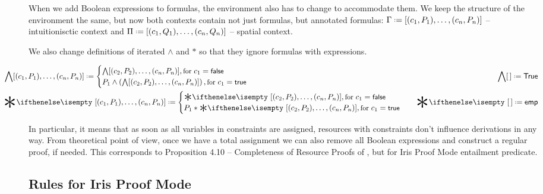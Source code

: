 When we add Boolean expressions to formulas, the environment also has to change to accommodate them.
We keep the structure of the environment the same, but now both contexts contain not just formulas, but annotated formulas:
\(\IntuD \defeq [(c_1,P_1),\dots,(c_n,P_n)]\) -- intuitionisctic context and \(\SpatD \defeq [(c_1,Q_1),\dots,(c_n,Q_n)]\) -- spatial context.

We also change definitions of iterated \(\wedge\) and \(*\) so that they ignore formulas with \false expressions.

\begin{minipage}[t]{1.1\linewidth}
  \begin{align*}
    & \hspace{-0.1\linewidth}
      \bigwedge  [(c_1, P_1), \dots, (c_n, P_n)] \defeq
      \begin{cases}
        \bigwedge [(c_2, P_2), \dots, (c_n, P_n)],
          {\small \text{for } c_1 = \false}\\
        P_1 \wedge \left( \bigwedge [(c_2, P_2), \dots, (c_n, P_n)] \right),
          {\small \text{for } c_1 = \true }
      \end{cases}
    & \bigwedge [\,] \defeq \True \\
    & \hspace{-0.1\linewidth}
      \Sep {[(c_1, P_1), \dots, (c_n, P_n)]} \defeq
      \begin{cases}
        \Sep {[(c_2, P_2), \dots, (c_n, P_n)]},
          {\small \text{for } c_1 = \false} \\
        P_1 * \Sep {[(c_2, P_2), \dots, (c_n, P_n)]},
          {\small \text{for } c_1 = \true}
      \end{cases}
    & \Sep {[\,]} \defeq \emp
  \end{align*}
\end{minipage}

In particular, it means that as soon as all variables in constraints are assigned, resources with \false constraints don't influence derivations in any way.
From theoretical point of view, once we have a total assignment we can also remove all Boolean expressions and construct a regular proof, if needed.
This corresponds to Proposition 4.10 -- Completeness of Resource Proofs of \citet[page~25]{harlandResourceDistributionBooleanConstraints2003}, but for Iris Proof Mode entailment predicate.

\subsection{Rules for Iris Proof Mode}

